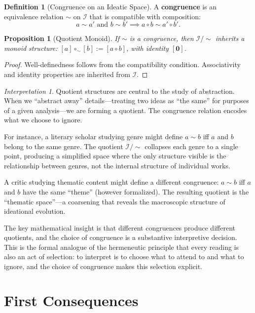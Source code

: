 \documentclass[11pt,openany]{book}
\theoremstyle{definition}
\newtheorem{definition}[axiom]{Definition}
\theoremstyle{plain}
\newtheorem{proposition}[axiom]{Proposition}
\theoremstyle{remark}
\newtheorem{interpretation}[axiom]{Interpretation}
\newcommand{\IS}{\mathcal{I}}               %
\newcommand{\compose}{\circ}                 %
\newcommand{\void}{\mathbf{0}}              %
\begin{document}
\begin{definition}[Congruence on an Ideatic Space]
A \textbf{congruence} is an equivalence relation $\sim$ on $\IS$ that is compatible with composition:
\[
a \sim a' \text{ and } b \sim b' \implies a \compose b \sim a' \compose b'.
\]
\end{definition}

\begin{proposition}[Quotient Monoid]
If $\sim$ is a congruence, then $\IS/{\sim}$ inherits a monoid structure: $[a] \compose_\sim [b] := [a \compose b]$, with identity $[\void]$.
\end{proposition}

\begin{proof}
Well-definedness follows from the compatibility condition. Associativity and identity properties are inherited from $\IS$.
\end{proof}

\begin{interpretation}
Quotient structures are central to the study of abstraction. When we ``abstract away'' details---treating two ideas as ``the same'' for purposes of a given analysis---we are forming a quotient. The congruence relation encodes what we choose to ignore.

For instance, a literary scholar studying genre might define $a \sim b$ iff $a$ and $b$ belong to the same genre. The quotient $\IS/{\sim}$ collapses each genre to a single point, producing a simplified space where the only structure visible is the relationship between genres, not the internal structure of individual works.

A critic studying thematic content might define a different congruence: $a \sim b$ iff $a$ and $b$ have the same ``theme'' (however formalized). The resulting quotient is the ``thematic space''---a coarsening that reveals the macroscopic structure of ideational evolution.

The key mathematical insight is that different congruences produce different quotients, and the choice of congruence is a substantive interpretive decision. This is the formal analogue of the hermeneutic principle that every reading is also an act of selection: to interpret is to choose what to attend to and what to ignore, and the choice of congruence makes this selection explicit.
\end{interpretation}

\section{First Consequences}
\end{document}
